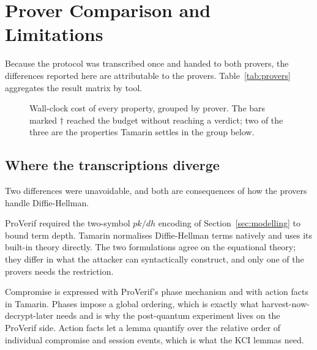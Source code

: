 \section{Prover Comparison and Limitations}
\label{sec:discussion}

Because the protocol was transcribed once and handed to both provers, the
differences reported here are attributable to the provers.
Table~\ref{tab:provers} aggregates the result matrix by tool.

\begin{table}[t]
\centering
\caption{The two provers on one transcription. ``Wall-clock spent undecided''
is budget consumed without producing a verdict; it is a cost, not a result.}
\label{tab:provers}
\footnotesize

\end{table}

\ifwgtimings
\begin{figure}[t]
\centering
\resizebox{\columnwidth}{!}{}
\caption{Wall-clock cost of every property, grouped by prover. The bars
marked \(\dagger\) reached the budget without reaching a verdict; two of the
three are the properties Tamarin settles in the group below.}
\label{fig:cost}
\end{figure}
\fi

\subsection{Where the transcriptions diverge}

Two differences were unavoidable, and both are consequences of how the provers
handle Diffie-Hellman.

 ProVerif required the two-symbol
\(\mathit{pk}/\mathit{dh}\) encoding of Section~\ref{sec:modelling} to bound
term depth. Tamarin normalises Diffie-Hellman terms natively and uses its
built-in theory directly. The two formulations agree on the equational theory;
they differ in what the attacker can syntactically construct, and only one of
the provers needs the restriction.

 Compromise is expressed with ProVerif's phase
mechanism and with action facts in Tamarin. Phases impose a global ordering,
which is exactly what harvest-now-decrypt-later needs and is why the
post-quantum experiment lives on the ProVerif side. Action facts let a lemma
quantify over the relative order of individual compromise and session events,
which is what the KCI lemmas need.

